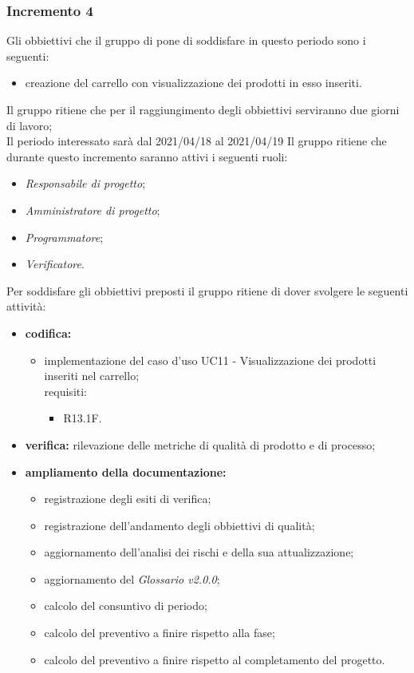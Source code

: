 \subsubsection{Incremento 4}
Gli obbiettivi che il gruppo di pone di soddisfare in questo periodo sono i seguenti:
\begin{itemize}
    \item creazione del carrello con visualizzazione dei prodotti in esso inseriti.
\end{itemize}
Il gruppo ritiene che per il raggiungimento degli obbiettivi serviranno due giorni di lavoro;\\
Il periodo interessato sarà dal 2021/04/18 al 2021/04/19
Il gruppo ritiene che durante questo incremento saranno attivi i seguenti ruoli:
\begin{itemize}
    \item \textit{Responsabile di progetto};
    \item \textit{Amministratore di progetto};
    \item \textit{Programmatore};
    \item \textit{Verificatore}.
\end{itemize}
Per soddisfare gli obbiettivi preposti il gruppo ritiene di dover svolgere le seguenti attività:
\begin{itemize}
    \item \textbf{codifica:}
          \begin{itemize}
              \item implementazione del caso d'uso UC11 - Visualizzazione dei prodotti inseriti nel carrello;\\ requisiti:
                    \begin{itemize}
                        \item R13.1F.
                    \end{itemize}
          \end{itemize}
    \item \textbf{verifica:} rilevazione delle metriche di qualità di prodotto e di processo;
    \item \textbf{ampliamento della documentazione:}
          \begin{itemize}
              \item registrazione degli esiti di verifica;
              \item registrazione dell'andamento degli obbiettivi di qualità;
              \item aggiornamento dell'analisi dei rischi e della sua attualizzazione;
              \item aggiornamento del \textit{Glossario v2.0.0};
              \item calcolo del consuntivo di periodo;
              \item calcolo del preventivo a finire rispetto alla fase;
              \item calcolo del preventivo a finire rispetto al completamento del progetto.
          \end{itemize}
\end{itemize}


